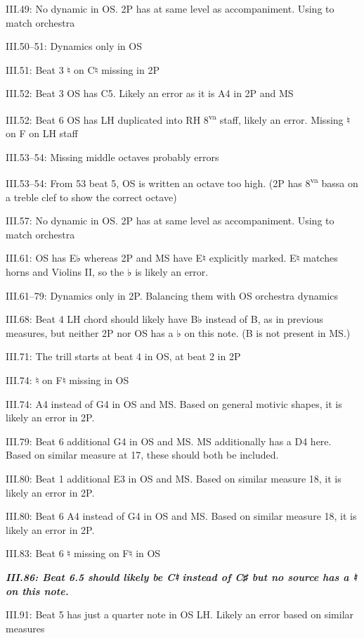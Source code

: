 \documentclass[twoside]{article}
\newcommand\dynmark[1]{\scalebox{0.9}{#1}{\kern1pt}}
\begin{document}
\begin{hangparas}{15pt}{1}
\begin{multicols}{2}
III.49: No dynamic in OS. 2P has \dynmark{\pp} at same level as accompaniment. Using \dynmark{\p} to match orchestra

III.50--51: Dynamics only in OS

III.51: Beat 3 ♮ on C♮ missing in 2P

III.52: Beat 3 OS has C5. Likely an error as it is A4 in 2P and MS

III.52: Beat 6 OS has LH duplicated into RH 8\textsuperscript{va} staff, likely an error. Missing ♮ on F on LH staff

III.53--54: Missing middle octaves probably errors

III.53--54: From 53 beat 5, OS is written an octave too high. (2P has 8\textsuperscript{va} bassa on a treble clef to show the correct octave)

III.57: No dynamic in OS. 2P has \dynmark{\pp} at same level as accompaniment. Using \dynmark{\p} to match orchestra

III.61: OS has E♭ whereas 2P and MS have E♮ explicitly marked. E♮ matches horns and Violins II, so the ♭ is likely an error.

III.61--79: Dynamics only in 2P. Balancing them with OS orchestra dynamics

III.68: Beat 4 LH chord should likely have B♭ instead of B, as in previous measures, but neither 2P nor OS has a ♭ on this note. (B is not present in MS.)

III.71: The trill starts at beat 4 in OS, at beat 2 in 2P

III.74: ♮ on F♮ missing in OS

III.74: A4 instead of G4 in OS and MS. Based on general motivic shapes, it is likely an error in 2P.

III.79: Beat 6 additional G4 in OS and MS. MS additionally has a D4 here. Based on similar measure at 17, these should both be included.

III.80: Beat 1 additional E3 in OS and MS. Based on similar measure 18, it is likely an error in 2P.

III.80: Beat 6 A4 instead of G4 in OS and MS. Based on similar measure 18, it is likely an error in 2P.

III.83: Beat 6 ♮ missing on F♮ in OS

\textbf{\textit{III.86: Beat 6.5 should likely be C♮ instead of C♯ but no source has a ♮ on this note.}}

III.91: Beat 5 has just a quarter note in OS LH. Likely an error based on similar measures


\end{multicols}
\end{hangparas}
\end{document}
